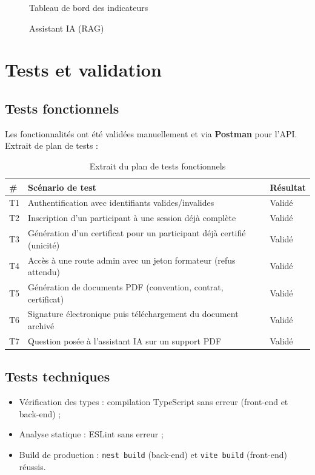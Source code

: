\documentclass[12pt,a4paper]{report}
\begin{document}
\begin{figure}[H]
\centering
{}
\caption{Tableau de bord des indicateurs}
\end{figure}

\begin{figure}[H]
\centering
{}
\caption{Assistant IA (RAG)}
\end{figure}

\section{Tests et validation}
\subsection{Tests fonctionnels}
Les fonctionnalités ont été validées manuellement et via \textbf{Postman}
pour l'API. Extrait de plan de tests :
\begin{table}[H]
\small
\begin{tabularx}{\textwidth}{C{1cm} X C{2.5cm}}
\toprule
\textbf{\#} & \textbf{Scénario de test} & \textbf{Résultat} \\
\midrule
T1 & Authentification avec identifiants valides/invalides & Validé \\
T2 & Inscription d'un participant à une session déjà complète & Validé \\
T3 & Génération d'un certificat pour un participant déjà certifié (unicité) & Validé \\
T4 & Accès à une route admin avec un jeton formateur (refus attendu) & Validé \\
T5 & Génération de documents PDF (convention, contrat, certificat) & Validé \\
T6 & Signature électronique puis téléchargement du document archivé & Validé \\
T7 & Question posée à l'assistant IA sur un support PDF & Validé \\
\bottomrule
\end{tabularx}
\caption{Extrait du plan de tests fonctionnels}
\end{table}

\subsection{Tests techniques}
\begin{itemize}
  \item Vérification des types : compilation TypeScript sans erreur
    (front-end et back-end) ;
  \item Analyse statique : ESLint sans erreur ;
  \item Build de production : \texttt{nest build} (back-end) et
    \texttt{vite build} (front-end) réussis.
\end{itemize}
\end{document}

